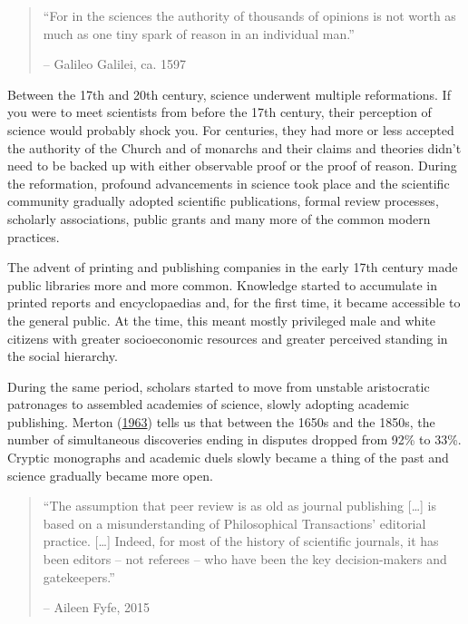 \documentclass[
]{book}
\begin{document}
\begin{quote}
``For in the sciences the authority of thousands of opinions is not worth as much as one tiny spark of reason in an individual man.''

-- Galileo Galilei, ca. 1597
\end{quote}

Between the 17th and 20th century, science underwent multiple reformations. If you were to meet scientists from before the 17th century, their perception of science would probably shock you. For centuries, they had more or less accepted the authority of the Church and of monarchs and their claims and theories didn't need to be backed up with either observable proof or the proof of reason. During the reformation, profound advancements in science took place and the scientific community gradually adopted scientific publications, formal review processes, scholarly associations, public grants and many more of the common modern practices.

The advent of printing and publishing companies in the early 17th century made public libraries more and more common. Knowledge started to accumulate in printed reports and encyclopaedias and, for the first time, it became accessible to the general public. At the time, this meant mostly privileged male and white citizens with greater socioeconomic resources and greater perceived standing in the social hierarchy.

During the same period, scholars started to move from unstable aristocratic patronages to assembled academies of science, slowly adopting academic publishing. Merton (\href{https://www.cambridge.org/core/journals/european-journal-of-sociology-archives-europeennes-de-sociologie/article/abs/resistance-to-the-systematic-study-of-multiple-discoveries-in-science/8FEC108B3D8B0DAD60416B36BE342959}{1963}) tells us that between the 1650s and the 1850s, the number of simultaneous discoveries ending in disputes dropped from 92\% to 33\%. Cryptic monographs and academic duels slowly became a thing of the past and science gradually became more open.

\begin{quote}
``The assumption that peer review is as old as journal publishing {[}\ldots{]} is based on a misunderstanding of Philosophical Transactions' editorial practice. {[}\ldots{]} Indeed, for most of the history of scientific journals, it has been editors -- not referees -- who have been the key decision-makers and gatekeepers.''

-- Aileen Fyfe, 2015
\end{quote}
\end{document}
